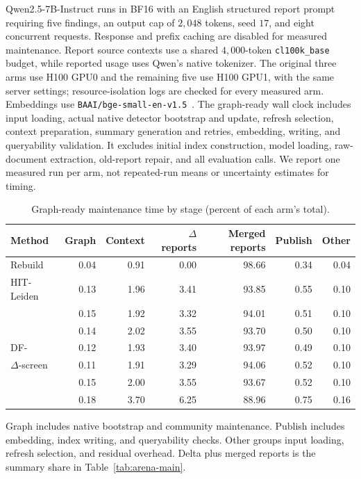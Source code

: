  Qwen2.5-7B-Instruct runs in BF16 with an
English structured report prompt requiring five findings, an output cap of
$2{,}048$ tokens, seed $17$, and eight concurrent requests. Response and
prefix caching are disabled for measured maintenance. Report source contexts
use a shared $4{,}000$-token \texttt{cl100k\_base} budget, while reported usage
uses Qwen's native tokenizer. The original three arms
use H100 GPU0 and the remaining five use H100 GPU1, with the same server
settings; resource-isolation logs are checked for every measured arm.
Embeddings use \texttt{BAAI/bge-small-en-v1.5}~\cite{xiao2024cpack}.
The graph-ready wall clock includes input loading, actual native detector
bootstrap and update, refresh selection, context preparation, summary
generation and retries, embedding, writing, and queryability validation.
It excludes initial index construction, model loading, raw-document extraction,
old-report repair, and all evaluation calls. We report one measured run per
arm, not repeated-run means or uncertainty estimates for timing.
\begin{table}[tb]\centering
\caption{Graph-ready maintenance time by stage (percent of each arm's total).}
\label{tab:maintenance-phases}
\footnotesize
\setlength{\tabcolsep}{0.25em}
\begin{tabular*}{\linewidth}{@{\extracolsep{\fill}}lrrrrrr@{}}
\toprule
Method & Graph & Context & $\Delta$ reports & Merged reports & Publish & Other \\
\midrule
Rebuild & 0.04 & 0.91 & 0.00 & 98.66 & 0.34 & 0.04 \\
HIT-Leiden & 0.13 & 1.96 & 3.41 & 93.85 & 0.55 & 0.10 \\
\DynaMo{} & 0.15 & 1.92 & 3.32 & 94.01 & 0.51 & 0.10 \\
\QCA{} & 0.14 & 2.02 & 3.55 & 93.70 & 0.50 & 0.10 \\
DF-\Louvain{} & 0.12 & 1.93 & 3.40 & 93.97 & 0.49 & 0.10 \\
$\Delta$-screen & 0.11 & 1.91 & 3.29 & 94.06 & 0.52 & 0.10 \\
\Batch{} & 0.15 & 2.00 & 3.55 & 93.67 & 0.52 & 0.10 \\
\DyLo{} & 0.18 & 3.70 & 6.25 & 88.96 & 0.75 & 0.16 \\
\bottomrule
\end{tabular*}
\par\smallskip\raggedright
Graph includes native bootstrap and community maintenance. Publish includes embedding, index writing, and queryability checks. Other groups input loading, refresh selection, and residual overhead. Delta plus merged reports is the summary share in Table~\ref{tab:arena-main}.
\end{table}

